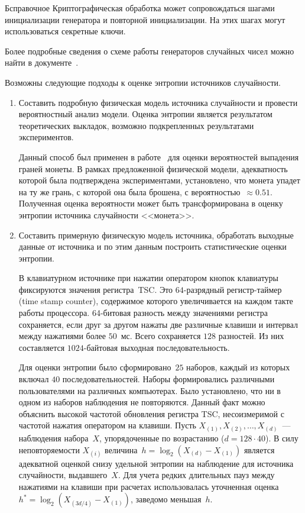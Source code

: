 \begin{appendix}{Б}{справочное}
Криптографическая обработка может сопровождаться шагами инициализации 
генератора и повторной инициализации. На этих шагах могут использоваться 
секретные ключи.

Более подробные сведения о схеме работы генераторов случайных чисел 
можно найти в документе~\cite{AIS31}.

\label{RNG.Entropy}

Возможны следующие подходы к оценке энтропии источников случайности.

\begin{enumerate}
\item 
Составить подробную физическая модель источника 
случайности и провести вероятностный анализ модели. Оценка энтропии 
является результатом теоретических выкладок, возможно подкрепленных 
результатами экспериментов. 

\begin{example}
Данный способ был применен в работе~\cite{DHM07} для оценки вероятностей
выпадения граней монеты. 
%
В рамках предложенной физической модели, адекватность
которой была подтверждена экспериментами, установлено, что монета упадет на
ту же грань, с которой она была брошена, с вероятностью~$\approx 0.51$.
%
Полученная оценка вероятности может быть трансформирована в оценку энтропии
источника случайности <<монета>>.
\end{example}

\item 
Составить примерную физическую модель источника, 
обработать выходные данные от источника и по этим данным построить
статистические оценки энтропии. 

\begin{example}
В клавиатурном источнике при нажатии оператором кнопок клавиатуры фиксируются 
значения регистра~TSC. Это $64$-разрядный регистр-таймер (time stamp counter), 
содержимое которого увеличивается на каждом такте работы процессора.
%
%
64-битовая разность между значениями регистра сохраняется, если друг за другом 
нажаты две различные клавиши и интервал между нажатиями более $50$~мс. 
Всего сохраняется $128$ разностей. Из них составляется $1024$-байтовая 
выходная последовательность.

Для оценки энтропии было сформировано~$25$ наборов, 
каждый из которых включал $40$ последовательностей.
%
Наборы формировались различными пользователями на различных компьютерах. 
%
Было установлено, что ни в одном из наборов наблюдения не повторяются.
Данный факт можно объяснить высокой частотой обновления регистра TSC,
несоизмеримой с частотой нажатия оператором на клавиши.
%
Пусть $X_{(1)},X_{(2)},\ldots,X_{(d)}$~--- наблюдения набора~$X$, 
упорядоченные по возрастанию ($d=128\cdot 40$). 
%
В силу неповторяемости $X_{(i)}$ величина~$h=\log_2(X_{(d)}-X_{(1)})$
является адекватной оценкой снизу удельной энтропии на наблюдение для 
источника случайности, выдавшего~$X$.
%
Для учета редких длительных пауз между нажатиями на клавиши
при расчетах использовалась уточненная оценка $h^*=\log_2(X_{(3d/4)}-X_{(1)})$,
заведомо меньшая~$h$.


\end{example}
\end{enumerate}
\end{appendix}
